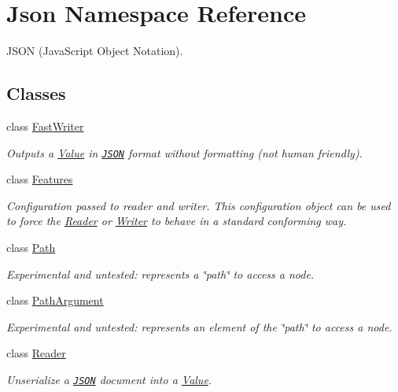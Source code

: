 \hypertarget{namespace_json}{\section{Json Namespace Reference}
\label{namespace_json}
}


J\+S\+O\+N (Java\+Script Object Notation).  


\subsection*{Classes}
\begin{DoxyCompactItemize}
\item 
class \hyperlink{class_json_1_1_fast_writer}{Fast\+Writer}
\begin{DoxyCompactList}\small\item\em Outputs a \hyperlink{class_json_1_1_value}{Value} in \href{http://www.json.org}{\tt J\+S\+O\+N} format without formatting (not human friendly). \end{DoxyCompactList}\item 
class \hyperlink{class_json_1_1_features}{Features}
\begin{DoxyCompactList}\small\item\em Configuration passed to reader and writer. This configuration object can be used to force the \hyperlink{class_json_1_1_reader}{Reader} or \hyperlink{class_json_1_1_writer}{Writer} to behave in a standard conforming way. \end{DoxyCompactList}\item 
class \hyperlink{class_json_1_1_path}{Path}
\begin{DoxyCompactList}\small\item\em Experimental and untested\+: represents a \char`\"{}path\char`\"{} to access a node. \end{DoxyCompactList}\item 
class \hyperlink{class_json_1_1_path_argument}{Path\+Argument}
\begin{DoxyCompactList}\small\item\em Experimental and untested\+: represents an element of the \char`\"{}path\char`\"{} to access a node. \end{DoxyCompactList}\item 
class \hyperlink{class_json_1_1_reader}{Reader}
\begin{DoxyCompactList}\small\item\em Unserialize a \href{http://www.json.org}{\tt J\+S\+O\+N} document into a \hyperlink{class_json_1_1_value}{Value}. \end{DoxyCompactList}\item 

\end{DoxyCompactItemize}
